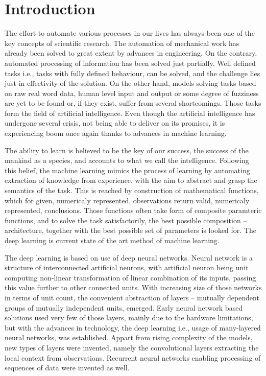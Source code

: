 \chapter*{Introduction}

The effort to automate various processes in our lives has always been one of the key concepts of scientific research. The automation of mechanical work has already been solved to great extent by advances in engineering. On the contrary, automated processing of information has been solved just partially. Well defined tasks i.e., tasks with fully defined behaviour, can be solved, and the challenge lies just in effectivity of the solution. On the other hand, models solving tasks based on raw real word data, human level input and output or some degree of fuzziness are yet to be found or, if they exist, suffer from several shortcomings. Those tasks form the field of artificial intelligence. Even though the artificial intelligence has undergone several crisis, not being able to deliver on its promises, it is experiencing boom once again thanks to advances in machine learning.

The ability to learn is believed to be the key of our success, the success of the mankind as a species, and accounts to what we call the intelligence. Following this belief, the machine learning mimics the process of learning by automating extraction of knowledge from experience, with the aim to abstract and grasp the semantics of the task. This is reached by construction of mathematical functions, which for given, numericaly represented, observations return valid, numericaly represented, conclusions. Those functions often take form of composite paramteric functions, and to solve the task satisfactorily, the best possible composition -- architecture, together with the best possible set of parameters is looked for. The deep learning is current state of the art method of machine learning.

The deep learning is based on use of deep neural networks. Neural network is a structure of interconnected artificial neurons, with artificial neuron being unit computing non-linear transformation of linear combination of its inputs, passing this value further to other connected units. With increasing size of those networks in terms of unit count, the convenient abstraction of layers -- mutually dependent groups of mutually independent units, emerged. Early neural network based solutions used very few of those layers, mainly due to the hardware limitations, but with the advances in technology, the deep learning i.e., usage of many-layered neural networks, was established. Appart from rising complexity of the models, new types of layers were invented, namely the convolutional layers extracting the local context from observations. Recurrent neural networks enabling processing of sequences of data were invented as well.

